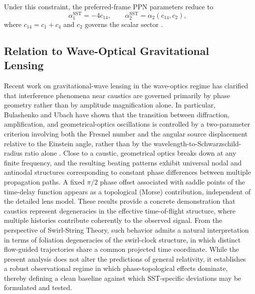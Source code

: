 \documentclass[11pt]{article}
\begin{document}
        Under this constraint, the preferred-frame PPN parameters reduce to
        \begin{equation}
            \alpha_1^{\mathrm{SST}} = -4 c_{14},
            \qquad
            \alpha_2^{\mathrm{SST}} = \alpha_2(c_{14},c_2),
        \end{equation}
        where $c_{14}=c_1+c_4$ and $c_2$ governs the scalar sector \cite{FosterJacobson}.

        \subsection{Relation to Wave-Optical Gravitational Lensing}
            Recent work on gravitational-wave lensing in the wave-optics regime has clarified that
            interference phenomena near caustics are governed primarily by phase geometry rather than
            by amplitude magnification alone. In particular, Bulashenko and Ubach have shown that the
            transition between diffraction, amplification, and geometrical-optics oscillations is
            controlled by a two-parameter criterion involving both the Fresnel number and the angular
            source displacement relative to the Einstein angle, rather than by the wavelength-to-Schwarzschild-radius
            ratio alone \cite{BulashenkoUbach2022}. Close to a caustic, geometrical optics breaks down
            at any finite frequency, and the resulting beating patterns exhibit universal nodal and
            antinodal structures corresponding to constant phase differences between multiple
            propagation paths. A fixed $\pi/2$ phase offset associated with saddle points of the
            time-delay function appears as a topological (Morse) contribution, independent of the
            detailed lens model. These results provide a concrete demonstration that caustics represent
            degeneracies in the effective time-of-flight structure, where multiple histories contribute
            coherently to the observed signal. From the perspective of Swirl-String Theory, such behavior
            admits a natural interpretation in terms of foliation degeneracies of the swirl-clock
            structure, in which distinct flow-guided trajectories share a common projected time
            coordinate. While the present analysis does not alter the predictions of general relativity,
            it establishes a robust observational regime in which phase-topological effects dominate,
            thereby defining a clean baseline against which SST-specific deviations may be formulated
            and tested.
\end{document}
